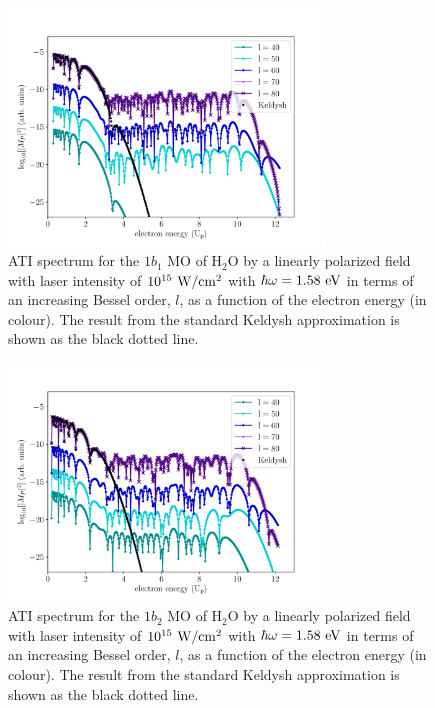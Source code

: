 \begin{figure}
  \centering
  \includegraphics[width=0.75\textwidth]
                  {figures/ch_ATI_SFA/1b1/l40to80n512WP50PG25MR35vsKeldysh.pdf}
  \caption{ATI spectrum for the $1b_{1}$ MO of H$_{2}$O by a linearly
    polarized field with laser intensity of $10^{15}\ \rm{W/cm^{2}}$
    with $\hbar\omega = 1.58\ \rm{eV}$ in terms of an increasing
    Bessel order, $l$, as a function of the electron energy (in
    colour). The result from the standard Keldysh approximation is
    shown as the black dotted line.}
  \label{fig:1b1_spectrum}
\end{figure}

\begin{figure}
  \centering
  \includegraphics[width=0.75\textwidth]
                  {figures/ch_ATI_SFA/1b2/l40to80n512WP50PG25MR35vsKeldysh.pdf}
  \caption{ATI spectrum for the $1b_{2}$ MO of H$_{2}$O by a linearly
    polarized field with laser intensity of $10^{15}\ \rm{W/cm^{2}}$
    with $\hbar\omega = 1.58\ \rm{eV}$ in terms of an increasing
    Bessel order, $l$, as a function of the electron energy (in
    colour). The result from the standard Keldysh approximation is
    shown as the black dotted line.}
  \label{fig:1b2_spectrum}
\end{figure}





